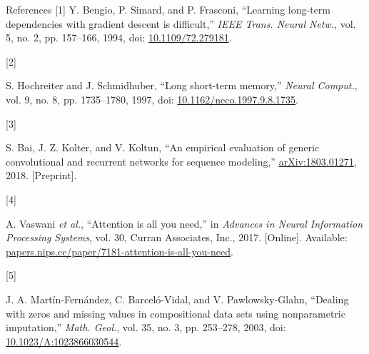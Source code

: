 \begin{frame}{References}
\begingroup
\fontsize{8.2}{10.1}\selectfont
\setlength{\parskip}{6pt}
\setlength{\parindent}{0pt}
\hangindent=15pt
\hypertarget{ref:bengio1994}{[1]} Y. Bengio, P. Simard, and P. Frasconi,
``Learning long-term dependencies with gradient descent is difficult,''
\textsl{IEEE Trans. Neural Netw.}, vol. 5, no. 2, pp. 157--166, 1994,
doi: \href{https://doi.org/10.1109/72.279181}{10.1109/72.279181}.\par

\hangindent=15pt
\hypertarget{ref:hochreiter1997}{[2]} S. Hochreiter and J. Schmidhuber,
``Long short-term memory,'' \textsl{Neural Comput.}, vol. 9, no. 8,
pp. 1735--1780, 1997,
doi: \href{https://doi.org/10.1162/neco.1997.9.8.1735}{10.1162/neco.1997.9.8.1735}.\par

\hangindent=15pt
\hypertarget{ref:bai2018}{[3]} S. Bai, J. Z. Kolter, and V. Koltun,
``An empirical evaluation of generic convolutional and recurrent networks
for sequence modeling,'' \href{https://arxiv.org/abs/1803.01271}{arXiv:1803.01271},
2018. [Preprint].\par

\hangindent=15pt
\hypertarget{ref:vaswani2017}{[4]} A. Vaswani \textsl{et al.}, ``Attention is all you need,''
in \textsl{Advances in Neural Information Processing Systems}, vol. 30,
Curran Associates, Inc., 2017. [Online]. Available:
\href{https://papers.nips.cc/paper/7181-attention-is-all-you-need}{papers.nips.cc/paper/7181-attention-is-all-you-need}.\par

\hangindent=15pt
\hypertarget{ref:martin2003}{[5]} J. A. Mart\'{i}n-Fern\'{a}ndez, C. Barcel\'{o}-Vidal,
and V. Pawlowsky-Glahn, ``Dealing with zeros and missing values in compositional
data sets using nonparametric imputation,'' \textsl{Math. Geol.}, vol. 35,
no. 3, pp. 253--278, 2003,
doi: \href{https://doi.org/10.1023/A:1023866030544}{10.1023/A:1023866030544}.\par

\endgroup
\end{frame}
